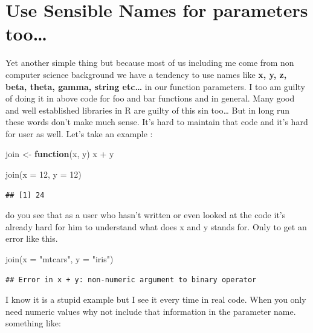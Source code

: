 \documentclass[
]{book}
\newenvironment{Shaded}{\begin{snugshade}}{\end{snugshade}}
\newcommand{\AttributeTok}[1]{\textcolor[rgb]{0.77,0.63,0.00}{#1}}
\newcommand{\ControlFlowTok}[1]{\textcolor[rgb]{0.13,0.29,0.53}{\textbf{#1}}}
\newcommand{\DecValTok}[1]{\textcolor[rgb]{0.00,0.00,0.81}{#1}}
\newcommand{\FunctionTok}[1]{\textcolor[rgb]{0.00,0.00,0.00}{#1}}
\newcommand{\NormalTok}[1]{#1}
\newcommand{\OtherTok}[1]{\textcolor[rgb]{0.56,0.35,0.01}{#1}}
\newcommand{\SpecialCharTok}[1]{\textcolor[rgb]{0.00,0.00,0.00}{#1}}
\newcommand{\StringTok}[1]{\textcolor[rgb]{0.31,0.60,0.02}{#1}}
\begin{document}
\hypertarget{use-sensible-names-for-parameters-too}{%
\section{Use Sensible Names for parameters too\ldots{}}\label{use-sensible-names-for-parameters-too}}

Yet another simple thing but because most of us including me come from non computer science background we have a tendency to use names like \textbf{x, y, z, beta, theta, gamma, string etc\ldots{}} in our function parameters. I too am guilty of doing it in above code for foo and bar functions and in general. Many good and well established libraries in R are guilty of this sin too\ldots{} But in long run these words don't make much sense. It's hard to maintain that code and it's hard for user as well. Let's take an example :

\begin{Shaded}
\begin{Highlighting}[]
\NormalTok{join }\OtherTok{\textless{}{-}} \ControlFlowTok{function}\NormalTok{(x, y) x }\SpecialCharTok{+}\NormalTok{ y}

\FunctionTok{join}\NormalTok{(}\AttributeTok{x =} \DecValTok{12}\NormalTok{, }\AttributeTok{y =} \DecValTok{12}\NormalTok{)}
\end{Highlighting}
\end{Shaded}

\begin{verbatim}
## [1] 24
\end{verbatim}

do you see that as a user who hasn't written or even looked at the code it's already hard for him to understand what does x and y stands for. Only to get an error like this.

\begin{Shaded}
\begin{Highlighting}[]
\FunctionTok{join}\NormalTok{(}\AttributeTok{x =} \StringTok{"mtcars"}\NormalTok{, }\AttributeTok{y =} \StringTok{"iris"}\NormalTok{)}
\end{Highlighting}
\end{Shaded}

\begin{verbatim}
## Error in x + y: non-numeric argument to binary operator
\end{verbatim}

I know it is a stupid example but I see it every time in real code. When you only need numeric values why not include that information in the parameter name. something like:
\end{document}
